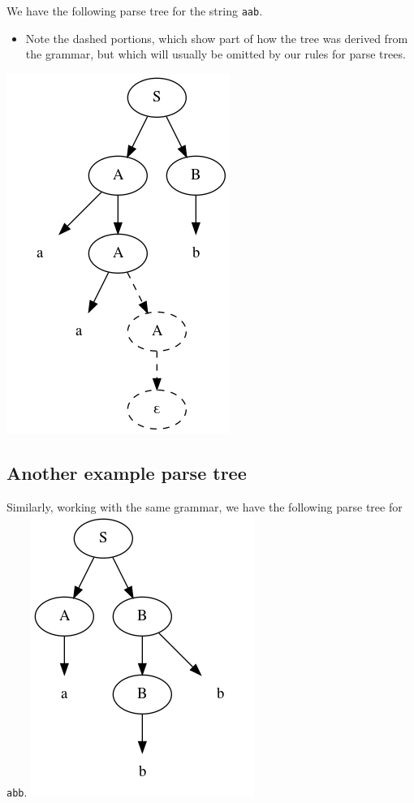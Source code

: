 \documentclass[11pt]{article}
\theoremstyle{definition}
\begin{document}
We have the following parse tree for the string \texttt{aab}.
\begin{itemize}
\item Note the dashed portions, which show part of how the tree
was derived from the grammar,
but which will usually be omitted by our rules for parse trees.
\end{itemize}
\includegraphics{media/parse-tree-example-aab.png}

\subsection{Another example parse tree}
\label{sec:orgdd24366}

Similarly, working with the same grammar,
we have the following parse tree for \texttt{abb}.
\includegraphics{media/parse-tree-example-abb.png}
\end{document}
